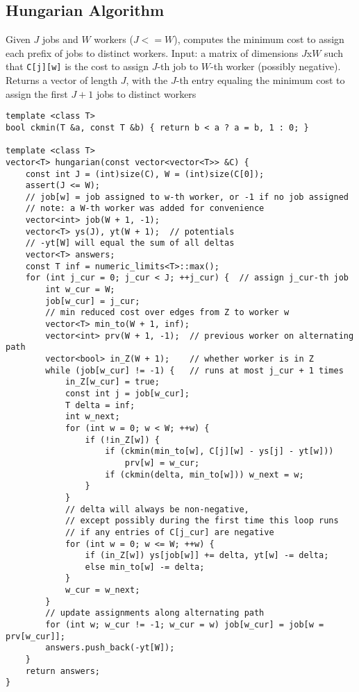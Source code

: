 \documentclass[8pt, headheight=10pt, a4paper]{article}
\begin{document}
\begin{multicols*}{3}
\subsection{Hungarian Algorithm}
Given $J$ jobs and $W$ workers ($J <= W$), computes the minimum cost to assign each prefix of jobs to distinct workers. Input: a matrix of dimensions $J$x$W$ such that \lstinline{C[j][w]} is the cost to assign $J$-th job to $W$-th worker (possibly negative). Returns a vector of length $J$, with the $J$-th entry equaling the minimum cost to assign the first $J+1$ jobs to distinct workers
\begin{lstlisting}
template <class T> 
bool ckmin(T &a, const T &b) { return b < a ? a = b, 1 : 0; }

template <class T>
vector<T> hungarian(const vector<vector<T>> &C) {
    const int J = (int)size(C), W = (int)size(C[0]);
    assert(J <= W);
    // job[w] = job assigned to w-th worker, or -1 if no job assigned
    // note: a W-th worker was added for convenience
    vector<int> job(W + 1, -1);
    vector<T> ys(J), yt(W + 1);  // potentials
    // -yt[W] will equal the sum of all deltas
    vector<T> answers;
    const T inf = numeric_limits<T>::max();
    for (int j_cur = 0; j_cur < J; ++j_cur) {  // assign j_cur-th job
        int w_cur = W;
        job[w_cur] = j_cur;
        // min reduced cost over edges from Z to worker w
        vector<T> min_to(W + 1, inf);
        vector<int> prv(W + 1, -1);  // previous worker on alternating path
        vector<bool> in_Z(W + 1);    // whether worker is in Z
        while (job[w_cur] != -1) {   // runs at most j_cur + 1 times
            in_Z[w_cur] = true;
            const int j = job[w_cur];
            T delta = inf;
            int w_next;
            for (int w = 0; w < W; ++w) {
                if (!in_Z[w]) {
                    if (ckmin(min_to[w], C[j][w] - ys[j] - yt[w]))
                        prv[w] = w_cur;
                    if (ckmin(delta, min_to[w])) w_next = w;
                }
            }
            // delta will always be non-negative,
            // except possibly during the first time this loop runs
            // if any entries of C[j_cur] are negative
            for (int w = 0; w <= W; ++w) {
                if (in_Z[w]) ys[job[w]] += delta, yt[w] -= delta;
                else min_to[w] -= delta;
            }
            w_cur = w_next;
        }
        // update assignments along alternating path
        for (int w; w_cur != -1; w_cur = w) job[w_cur] = job[w = prv[w_cur]];
        answers.push_back(-yt[W]);
    }
    return answers;
}


\end{lstlisting}
\end{multicols*}
\end{document}
